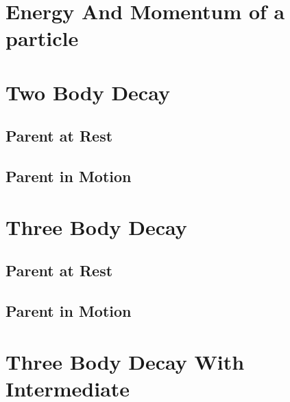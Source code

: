 \documentclass[a5paper,12pt]{article}
\begin{document}

\tableofcontents
\listoftables
\listoffigures
\clearpage
\section{Energy And Momentum of a particle}
\clearpage
\section{Two Body Decay}
\subsection{Parent at Rest}
\subsection{Parent in Motion}
\section{Three Body Decay}
\subsection{Parent at Rest}

\subsection{Parent in Motion}
\section{Three Body Decay With Intermediate}
\clearpage
{}
\printindex
\end{document}
